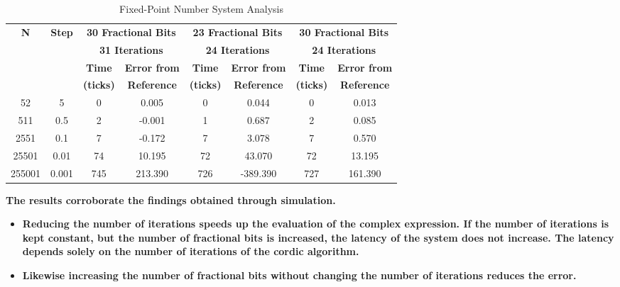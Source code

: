 \documentclass{article}
\begin{document}
\begin{table}[H]
  \centering
    \begin{tabular}{|c|c|c|c|c|c|c|c|}
    \hline
    \multirow{4}{*}{\textbf{N}} & \multirow{4}{*}{\textbf{Step}} & \multicolumn{2}{c|}{\textbf{30 Fractional Bits}} & \multicolumn{2}{c|}{\textbf{23 Fractional Bits}} & \multicolumn{2}{c|}{\textbf{30 Fractional Bits}} \\
\cline{3-8}          &       & \multicolumn{2}{c|}{\textbf{31 Iterations}} & \multicolumn{2}{c|}{\textbf{24 Iterations}} & \multicolumn{2}{c|}{\textbf{ 24 Iterations}} \\
\cline{3-8}          &       & \textbf{Time} & \textbf{Error from } & \textbf{Time} & \textbf{Error from} & \textbf{Time} & \textbf{Error from} \\
          &       & \textbf{ (ticks)} & \textbf{Reference} & \textbf{ (ticks)} & \textbf{Reference} & \textbf{ (ticks)} & \textbf{Reference}\\
    \hline
    52    & 5     & 0     & 0.005 & 0     &  0.044 & 0     & 0.013 \\
    \hline
    511   & 0.5   & 2     & -0.001 & 1     & 0.687 & 2    & 0.085 \\
    \hline
    2551  & 0.1   & 7     & -0.172 & 7     & 3.078 & 7     & 0.570 \\
    \hline
    25501 & 0.01  & 74    & 10.195 & 72    & 43.070 & 72    & 13.195 \\
    \hline
    255001 & 0.001 & 745   & 213.390 & 726   & -389.390 & 727   & 161.390 \\
    \hline
    \end{tabular}%
  \caption{Fixed-Point Number System Analysis}
  \label{tab:fixed_point_analysis}%
\end{table}%


\textbf{The results corroborate the findings obtained through simulation.}
\begin{itemize}
    \item \textbf{Reducing the number of iterations speeds up the  evaluation of the complex expression. If the number of iterations is kept constant, but the number of fractional bits is increased, the latency of the system does not increase. The latency depends solely on the number of iterations of the cordic algorithm.}
    \item \textbf{Likewise increasing the number of fractional bits without changing the number of iterations reduces the error.}
\end{itemize}
\end{document}
